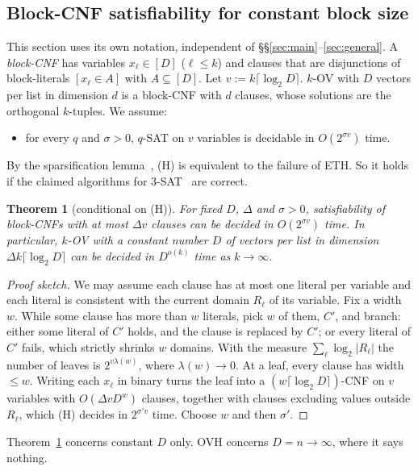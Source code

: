 \documentclass[11pt,a4paper]{article}
\theoremstyle{plain}
\newtheorem{theorem}{Theorem}
\theoremstyle{definition}
\theoremstyle{remark}
\begin{document}
\subsection{Block-CNF satisfiability for constant block size}
This section uses its own notation, independent of \S\S\ref{sec:main}--\ref{sec:general}. A \emph{block-CNF} has
variables $x_\ell\in[D]$ ($\ell\le k$) and clauses that are disjunctions of block-literals $[x_\ell\in A]$ with
$A\subseteq[D]$. Let $v:=k\lceil\log_2D\rceil$. $k$-OV with $D$ vectors per list in dimension $d$ is a block-CNF with
$d$ clauses, whose solutions are the orthogonal $k$-tuples. We assume:
\begin{itemize}
  \item[(H)] for every $q$ and $\sigma>0$, $q$-SAT on $v$ variables is decidable in $O(2^{\sigma v})$ time.
\end{itemize}
By the sparsification lemma~\cite{IPZ01}, (H) is equivalent to the failure of ETH. So it holds if the claimed
algorithms for 3-SAT~\cite{OpenAI26,Anthropic26} are correct.

\begin{theorem}[conditional on (H)]\label{thm:block}
For fixed $D$, $\Delta$ and $\sigma>0$, satisfiability of block-CNFs with at most $\Delta v$ clauses can be decided
in $O(2^{\sigma v})$ time. In particular, $k$-OV with a constant number $D$ of vectors per list in dimension
$\Delta k\lceil\log_2D\rceil$ can be decided in $D^{o(k)}$ time as $k\to\infty$.
\end{theorem}
\begin{proof}[Proof sketch]
We may assume each clause has at most one literal per variable and each literal is consistent with the current domain
$R_\ell$ of its variable. Fix a width $w$. While some clause has more than $w$ literals, pick $w$ of them, $C'$, and
branch: either some literal of $C'$ holds, and the clause is replaced by $C'$; or every literal of $C'$ fails, which
strictly shrinks $w$ domains. With the measure $\sum_\ell\log_2|R_\ell|$ the number of leaves is $2^{v\lambda(w)}$,
where $\lambda(w)\to0$. At a leaf, every clause has width $\le w$. Writing each $x_\ell$ in binary turns the leaf into a
$(w\lceil\log_2D\rceil)$-CNF on $v$ variables with $O(\Delta vD^w)$ clauses, together with clauses excluding values
outside $R_\ell$, which (H) decides in $2^{\sigma'v}$ time. Choose $w$ and then $\sigma'$.
\end{proof}
Theorem~\ref{thm:block} concerns constant $D$ only. OVH concerns $D=n\to\infty$, where it says nothing.
\end{document}
